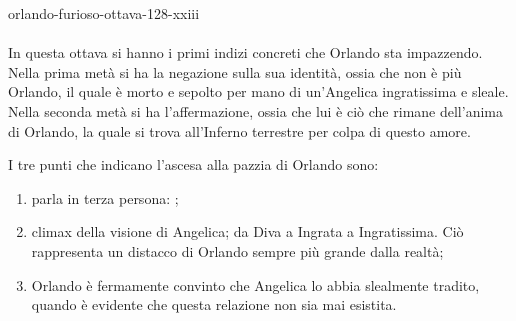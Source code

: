 \documentclass[preview]{standalone}
\begin{document}
\begin{snippet}{orlando-furioso-ottava-128-xxiii}
    \\\\
    In questa ottava si hanno i primi indizi concreti che
    Orlando sta impazzendo.
    Nella prima metà si ha la negazione sulla sua identità,
    ossia che non è più Orlando, il quale è morto e sepolto
    per mano di un'Angelica ingratissima e sleale.
    Nella seconda metà si ha l'affermazione, ossia
    che lui è ciò che rimane dell'anima di Orlando, la quale
    si trova all'Inferno terrestre per colpa di questo amore.

    I tre punti che indicano l'ascesa alla pazzia di Orlando sono:
    \begin{enumerate}
        \item parla in terza persona: ;
        \item climax della visione di Angelica; da Diva a Ingrata a Ingratissima.
            Ciò rappresenta un distacco di Orlando sempre più grande dalla realtà;
        \item Orlando è fermamente convinto che Angelica lo abbia slealmente tradito,
            quando è evidente che questa relazione non sia mai esistita.
    \end{enumerate}
\end{snippet}
\end{document}
